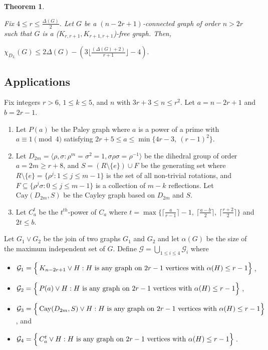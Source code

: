 \documentclass[12pt,reqno,a4paper]{amsart}
\theoremstyle{definition}
\newtheorem{thm}[defn]{Theorem}
\begin{document}
\begin{thm}\label{Theorem 1.7}{\em Fix $4\leq r\leq \frac{\Delta(G)}{2}$. Let $G$ be a $(n-2r+1)$-connected graph of order $n>2r$ such that
$G$ is a ($K_{r,r+1}, K_{r+1,r+1}$)-free graph.
Then, 
\begin{center}
$\chi_{D_{L}}(G)\leq 2\Delta(G)-  (3\lfloor\frac{(\Delta(G)+2)}{r+1}\rfloor-4)$.
\end{center}
}
\end{thm}

\subsection{Applications} 
Fix integers $r>6$, $1\leq k\leq 5$, and $n$ with $3r+3\le n\le r^2$. Let $a=n-2r+1$ and $b=2r-1$.
\begin{enumerate}
    \item Let $P(a)$ be the Paley graph where $a$ is a power of a prime with $a\equiv 1\pmod4$ satisfying $2r+5 \leq a \leq \min\{4r-3,\ (r-1)^2\}$.

    \item Let $D_{2m}=\langle \rho,\sigma : \rho^m=\sigma^2=1,
    \sigma\rho\sigma=\rho^{-1}\rangle$ 
be the dihedral group of order $a=2m\geq r+8$, and 
$S = (R\setminus\{e\}) \cup F$
be the generating set where $R\setminus\{e\}=\{\rho^j:1\le j\le m-1\}$ is the set of all non-trivial rotations, and 
$F\subseteq \{\rho^j\sigma:0\le j\le m-1\}$ is a collection of $m-k$ reflections.
Let $\mathrm{Cay}(D_{2m},S)$ be the Cayley graph based on $D_{2m}$ and $S$. 
     
     \item Let $C^{t}_{a}$ be the $t^{th}$-power of $C_{a}$ where $t=\max\Big\{\Big\lceil\frac{a}{r-1}\Big\rceil-1,\ \Big\lceil\frac{a-b}{2}\Big\rceil,\ \Big\lceil\frac{r+2}{2}\Big\rceil\Big\}$ and $2t\leq b$.
\end{enumerate}

Let $G_{1}\lor G_{2}$ be the join of two graphs $G_{1}$ and $G_{2}$ and let $\alpha(G)$ be the size of the maximum independent set of $G$. Define $\mathcal{G}=\bigcup_{1\leq i\leq 4}\mathcal{G}_{i}$ where

\begin{itemize}
   \item $\mathcal{G}_{1}=\Bigl\{\,K_{n-2r+1} \vee H: H \text{ is any graph on } 2r-1 \text{ vertices with }\alpha(H)\leq r-1\Bigl\}\,$,

    \item $\mathcal{G}_{2}=\Bigl\{\,P(a) \vee H: H \text{ is any graph on } 2r-1 \text{ vertices with }\alpha(H)\leq r-1\Bigl\}\,$,

    \item $\mathcal{G}_{3}=\Bigl\{\,\text{Cay}(D_{2m},S) \vee H: H \text{ is any graph on } 2r-1 \text{ vertices with }\alpha(H)\leq r-1\Bigl\}\,$, and 

    \item $\mathcal{G}_{4}=\Bigl\{\,C^{t}_{a} \vee H: H \text{ is any graph on } 2r-1 \text{ vertices with }\alpha(H)\leq r-1\Bigl\}\,$.
\end{itemize}
\end{document}
